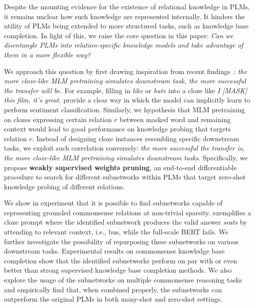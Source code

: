 Despite the mounting evidence for the existence of relational knowledge in PLMs, it remains unclear how such knowledge are represented internally. It hinders the utility of PLMs being extended to more structured tasks, such as knowledge base completion. In light of this, we raise the core question in this paper:
\textit{Can we disentangle PLMs into relation-specific knowledge models and take advantage of them in a more flexible way?}

We approach this question by first drawing inspiration from recent findings~\citep{DBLP:journals/corr/abs-2010-03648,DBLP:journals/corr/abs-2008-01064,inductivemlm}: \textit{the more cloze-like MLM pretraining simulates downstream task, the more successful the transfer will be.} For example, filling in \textit{like} or \textit{hate} into a cloze like \textit{I [MASK] this film, it's great.} provide a clear way in which the model can implicitly learn to perform sentiment classification. Similarly, we hypothesis that MLM pretraining on clozes expressing certain relation $r$ between masked word and remaining context would lead to good performance on knowledge probing that targets relation $r$. Instead of designing cloze instances resembling specific downstream tasks, we exploit such correlation conversely: \textit{the more successful the transfer is, the more cloze-like MLM pretraining simulates downstream tasks}.
Specifically, we propose \textbf{weakly supervised weights pruning}, 
an end-to-end differentiable procedure to search for different subnetworks within PLMs that target zero-shot knowledge probing of different relations. 

We show in experiment that it is possible to find subnetworks capable of representing grounded commonsense relations at non-trivial sparsity.  exemplifies a cloze prompt where the identified subnetwork produces the valid answer \textit{seats} by attending to relevant 
context, i.e., bus,  while the full-scale \textsc{BERT} fails. We further investigate the possibility of  repurposing these subnetworks on various downstream tasks. Experimental results on commonsense knowledge base completion show that the identified subnetworks perform on par with or even better than strong supervised knowledge base completion methods. We also explore the usage of the subnetworks on multiple commonsense reasoning tasks and empirically find that, when combined properly, the subnetworks can outperform the original PLMs in both many-shot and zero-shot settings.

